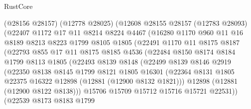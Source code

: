 \begin{lexlean}{RustCore}
\begin{coremodule}
                (@28156 @28157)
                (@12778 @28025)
                (@12608
                  @28155
                  @28157
                  (@12783 @28093)
                  (@22407
                    @1172
                    @17
                    @11
                    @8214
                    @8224
                    @4467
                    (@16280
                      @1170
                      @960
                      @11
                      @16
                      @8189
                      @8213
                      @8223
                      @1799
                      @8105
                      @1805
                      (@22491
                        @1170
                        @11
                        @8175
                        @8187
                        (@22793
                          @855
                          @17
                          @11
                          @8175
                          @8185
                          @4536
                          (@22484
                            @8150
                            @8174
                            @8184
                            @1799
                            @8113
                            @1805
                            (@22493
                              @8139
                              @8148
                              (@22499
                                @8139
                                @8146
                                @2919
                                (@22350
                                  @8138
                                  @8145
                                  @1799
                                  @8121
                                  @1805
                                  @16301
                                  (@22364
                                    @8131
                                    @1805
                                    @22375
                                    @16322
                                    @12898
                                    (@12881 (@12900 @8132 @1821)))
                                  @12898
                                  (@12881 (@12900 @8122 @8138)))
                                @15706
                                @15709
                                @15712
                                @15716
                                @15721
                                @22531))
                            (@22539
                              @8173
                              @8183
                              @1799

\end{coremodule}
\end{lexlean}
